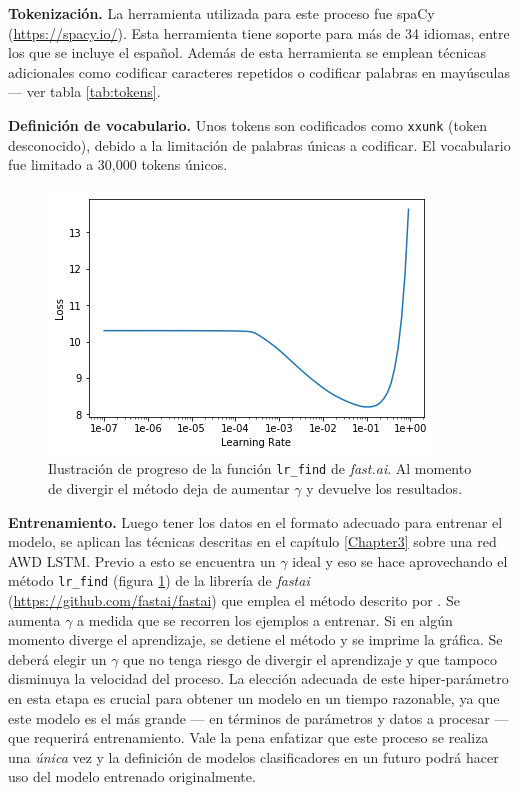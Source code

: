 \textbf{Tokenización.} La herramienta utilizada para este proceso fue spaCy (\url{https://spacy.io/}). Esta herramienta tiene soporte para más de 34 idiomas, entre los que se incluye el español. Además de esta herramienta se emplean técnicas adicionales como codificar caracteres repetidos o codificar palabras en mayúsculas --- ver tabla \ref{tab:tokens}.

\textbf{Definición de vocabulario.} Unos tokens son codificados como \texttt{xxunk} (token desconocido), debido a la limitación de palabras únicas a codificar. El vocabulario fue limitado a 30,000 tokens únicos.

\begin{figure}
\centering
\includegraphics[scale=1]{Figures/lrfinder.png}
\caption{Ilustración de progreso de la función \texttt{lr\_find} de \textit{fast.ai}. Al momento de divergir el método deja de aumentar $\gamma$ y devuelve los resultados.}
\label{fig:lrfind}
\end{figure}

\textbf{Entrenamiento.} Luego tener los datos en el formato adecuado para entrenar el modelo, se aplican las técnicas descritas en el capítulo \ref{Chapter3} sobre una red AWD LSTM. Previo a esto se encuentra un $ \gamma $ ideal y eso se hace aprovechando el método \texttt{lr\_find} (figura \ref{fig:lrfind}) de la librería de \emph{fastai} (\url{https://github.com/fastai/fastai}) que emplea el método descrito por \textcite{smith2017convergence}. Se aumenta $\gamma$ a medida que se recorren los ejemplos a entrenar. Si en algún momento diverge el aprendizaje, se detiene el método y se imprime la gráfica. Se deberá elegir un $\gamma$ que no tenga riesgo de divergir el aprendizaje y que tampoco disminuya la velocidad del proceso. La elección adecuada de este hiper-parámetro en esta etapa es crucial para obtener un modelo en un tiempo razonable, ya que este modelo es el más grande --- en términos de parámetros y datos a procesar --- que requerirá entrenamiento. Vale la pena enfatizar que este proceso se realiza una \emph{única} vez y la definición de modelos clasificadores en un futuro podrá hacer uso del modelo entrenado originalmente.

